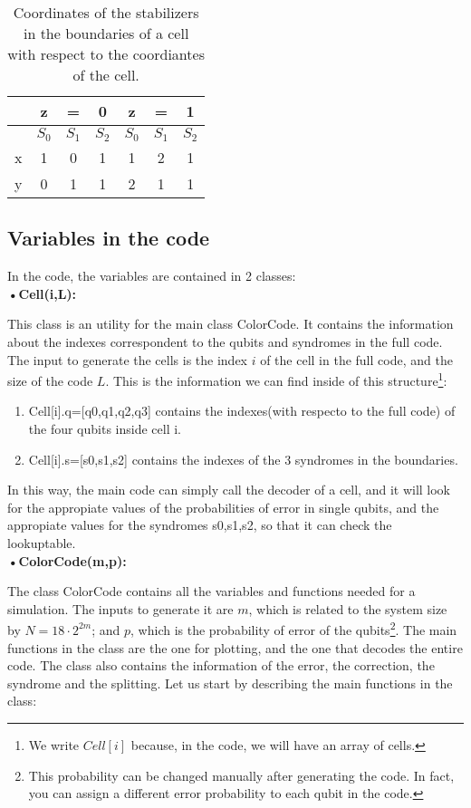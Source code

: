 \documentclass[a4paper,12pt]{article}
\begin{document}
\begin{table}[h]
\begin{center}
\begin{tabular}{|c|ccc|ccc|}
\hline
&z&=&0&z&=&1\\
\hline
&$S_0$&$S_1$&$S_2$&$S_0$&$S_1$&$S_2$\\
\hline
x&1&0&1&1&2&1\\
y&0&1&1&2&1&1\\
\hline

\end{tabular}
\caption{Coordinates of the stabilizers in the boundaries of a cell with respect to the coordiantes of the cell. }
\end{center}
\end{table}

\subsection{Variables in the code}

In the code, the variables are contained in 2 classes:\\

{\bf •Cell(i,L):} 


This class is an utility for the main class ColorCode. It contains  the information about the indexes correspondent to the qubits and syndromes in the full code. The input to generate the cells is the index $i$ of the cell in the full code, and the size of the code $L$. This is the information we can find inside of this structure\footnote{We write $Cell[i]$ because, in the code, we will have an array of cells.}:
\begin{enumerate}
\item Cell[i].q=[q0,q1,q2,q3] contains the indexes(with respecto to the full code) of the four qubits inside cell i.
\item Cell[i].s=[s0,s1,s2] contains the indexes of the 3 syndromes in the boundaries.
\end{enumerate}


In this way, the main code can simply call the decoder of a cell, and it will look for the appropiate values of the probabilities of error in single qubits, and the appropiate values for the syndromes s0,s1,s2, so that it can check the lookuptable.\\


{\bf •ColorCode(m,p):}


 The class ColorCode contains all the variables and functions needed for a simulation. The inputs to generate it are $m$, which is related to the system size by $N=18\cdot2^{2m}$; and $p$, which is the probability of error of the qubits\footnote{This probability can be changed manually after generating the code. In fact, you can assign a different error probability to each qubit in the code.}.  The main functions in the class are the one for plotting, and the one that decodes the entire code. The class also contains the information of the error, the correction, the syndrome and the splitting. Let us start by describing the main functions in the class:
\end{document}
